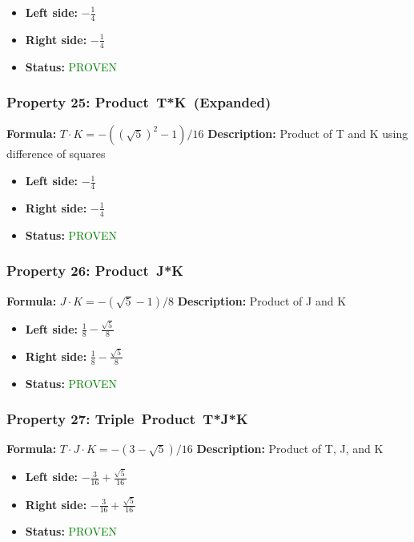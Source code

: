 \begin{itemize}
\item \textbf{Left side:} $- \frac{1}{4}$
\item \textbf{Right side:} $- \frac{1}{4}$
\item \textbf{Status:} \textcolor{green}{PROVEN}
\end{itemize}

\subsubsection*{Property 25: Product~T*K~(Expanded)}
\textbf{Formula:} $T \cdot K = -((\sqrt{5})^2-1)/16$
\textbf{Description:} Product of T and K using difference of squares

\begin{itemize}
\item \textbf{Left side:} $- \frac{1}{4}$
\item \textbf{Right side:} $- \frac{1}{4}$
\item \textbf{Status:} \textcolor{green}{PROVEN}
\end{itemize}

\subsubsection*{Property 26: Product~J*K}
\textbf{Formula:} $J  \cdot  K = -(\sqrt{5}-1)/8$
\textbf{Description:} Product of J and K

\begin{itemize}
\item \textbf{Left side:} $\frac{1}{8} - \frac{\sqrt{5}}{8}$
\item \textbf{Right side:} $\frac{1}{8} - \frac{\sqrt{5}}{8}$
\item \textbf{Status:} \textcolor{green}{PROVEN}
\end{itemize}

\subsubsection*{Property 27: Triple~Product~T*J*K}
\textbf{Formula:} $T \cdot J \cdot K = -(3-\sqrt{5})/16$
\textbf{Description:} Product of T, J, and K

\begin{itemize}
\item \textbf{Left side:} $- \frac{3}{16} + \frac{\sqrt{5}}{16}$
\item \textbf{Right side:} $- \frac{3}{16} + \frac{\sqrt{5}}{16}$
\item \textbf{Status:} \textcolor{green}{PROVEN}
\end{itemize}


